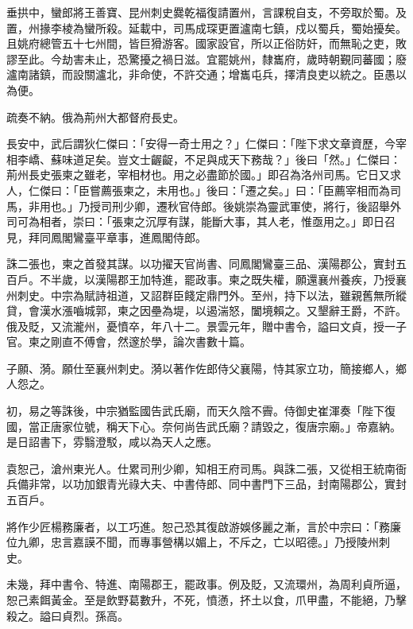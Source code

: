 \begin{pinyinscope}
 垂拱中，蠻郎將王善寶、昆州刺史爨乾福復請置州，言課稅自支，不旁取於蜀。及置，州掾李棱為蠻所殺。延載中，司馬成琛更置瀘南七鎮，戍以蜀兵，蜀始擾矣。且姚府總管五十七州間，皆巨猾游客。國家設官，所以正俗防奸，而無恥之吏，敗謬至此。今劫害未止，恐驚擾之禍日滋。宜罷姚州，隸巂府，歲時朝覲同蕃國；廢瀘南諸鎮，而設關瀘北，非命使，不許交通；增巂屯兵，擇清良吏以統之。臣愚以為便。



 疏奏不納。俄為荊州大都督府長史。



 長安中，武后謂狄仁傑曰：「安得一奇士用之？」仁傑曰：「陛下求文章資歷，今宰相李嶠、蘇味道足矣。豈文士齷齪，不足與成天下務哉？」後曰「然。」仁傑曰：荊州長史張柬之雖老，宰相材也。用之必盡節於國。」即召為洛州司馬。它日又求人，仁傑曰：「臣嘗薦張柬之，未用也。」後曰：「遷之矣。」曰：「臣薦宰相而為司馬，非用也。」乃授司刑少卿，遷秋官侍郎。後姚崇為靈武軍使，將行，後詔舉外司可為相者，崇曰：「張柬之沉厚有謀，能斷大事，其人老，惟亟用之。」即日召見，拜同鳳閣鸞臺平章事，進鳳閣侍郎。



 誅二張也，柬之首發其謀。以功擢天官尚書、同鳳閣鸞臺三品、漢陽郡公，實封五百戶。不半歲，以漢陽郡王加特進，罷政事。柬之既失權，願還襄州養疾，乃授襄州刺史。中宗為賦詩祖道，又詔群臣餞定鼎門外。至州，持下以法，雖親舊無所縱貸，會漢水漲嚙城郭，柬之因壘為堤，以遏湍怒，闔境賴之。又墾辭王爵，不許。俄及貶，又流瀧州，憂憤卒，年八十二。景雲元年，贈中書令，謚曰文貞，授一子官。柬之剛直不傅會，然邃於學，論次書數十篇。



 子願、漪。願仕至襄州刺史。漪以著作佐郎侍父襄陽，恃其家立功，簡接鄉人，鄉人怨之。



 初，易之等誅後，中宗猶監國告武氏廟，而天久陰不霽。侍御史崔渾奏「陛下復國，當正唐家位號，稱天下心。奈何尚告武氏廟？請毀之，復唐宗廟。」帝嘉納。是日詔書下，雰翳澄駁，咸以為天人之應。



 袁恕己，滄州東光人。仕累司刑少卿，知相王府司馬。與誅二張，又從相王統南衙兵備非常，以功加銀青光祿大夫、中書侍郎、同中書門下三品，封南陽郡公，實封五百戶。



 將作少匠楊務廉者，以工巧進。恕己恐其復啟游娛侈麗之漸，言於中宗曰：「務廉位九卿，忠言嘉謨不聞，而專事營構以媚上，不斥之，亡以昭德。」乃授陵州刺史。



 未幾，拜中書令、特進、南陽郡王，罷政事。例及貶，又流環州，為周利貞所逼，恕己素餌黃金。至是飲野葛數升，不死，憤懣，抔土以食，爪甲盡，不能絕，乃擊殺之。謚曰貞烈。孫高。




\end{pinyinscope}
